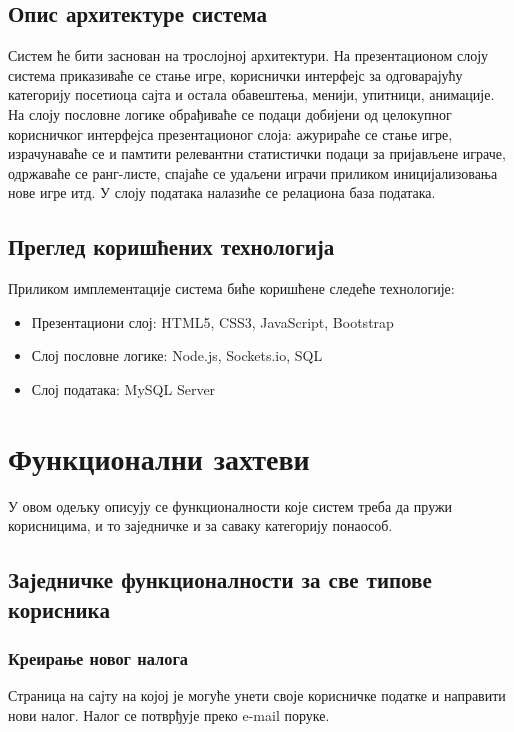 \subsection{Опис архитектуре система}
Систем ће бити заснован на трослојној архитектури. На презентационом слоју система приказиваће се стање игре, кориснички интерфејс за одговарајућу категорију посетиоца сајта и остала обавештења, менији, упитници, анимације. На слоју пословне логике обрађиваће се подаци добијени од целокупног корисничког интерфејса презентационог слоја: ажурираће се стање игре, израчунаваће се и памтити релевантни статистички подаци за пријављене играче, одржаваће се ранг-листе, спајаће се удаљени играчи приликом иницијализовања нове игре итд. У слоју података налазиће се релациона база података.






\subsection{Преглед коришћених технологија}
Приликом имплементације система биће коришћене следеће технологије:
\begin{itemize}
    \item Презентациони слој: HTML5, CSS3, JavaScript, Bootstrap
    \item Слој пословне логике: Node.js, Sockets.io, SQL
    \item Слој података: MySQL Server
\end{itemize}

\section{Функционални захтеви} 
У овом одељку описују се функционалности које систем треба да пружи корисницима, и то заједничке и за саваку категорију понаособ.

\subsection{Заједничке функционалности за све типове корисника}

\subsubsection{Креирање новог налога}
Страница на сајту на којој је могуће унети своје корисничке податке и направити нови налог. Налог се потврђује преко e-mail поруке.

